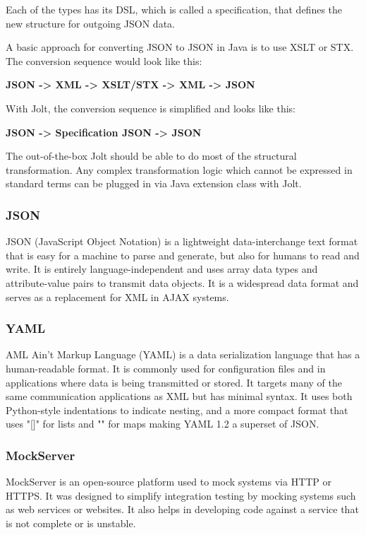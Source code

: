 Each of the types has its DSL, which is called a specification, that defines the new structure for outgoing JSON data.

A basic approach for converting JSON to JSON in Java is to use XSLT or STX. The conversion sequence would look like this:
\begin{center}
\textbf{JSON -> XML -> XSLT/STX -> XML -> JSON}
\end{center}

With Jolt, the conversion sequence is simplified and looks like this:
\begin{center}
\textbf{JSON -> Specification JSON -> JSON}
\end{center}

The out-of-the-box Jolt should be able to do most of the structural transformation. Any complex transformation logic which cannot be expressed in standard terms can be plugged in via Java extension class with Jolt.~\cite{jolt}

\subsubsection{JSON}
JSON (JavaScript Object Notation) is a lightweight data-interchange text format that is easy for a machine to parse and generate, but also for humans to read and write. It is entirely language-independent and uses array data types and attribute-value pairs to transmit data objects. It is a widespread data format and serves as a replacement for XML in AJAX systems.~\cite{json}

\subsubsection{YAML}
AML Ain't Markup Language (YAML) is a data serialization language that has a human-readable format. It is commonly used for configuration files and in applications where data is being transmitted or stored. It targets many of the same communication applications as XML but has minimal syntax. It uses both Python-style indentations to indicate nesting, and a more compact format that uses "[]" for lists and "{}" for maps making YAML 1.2 a superset of JSON.~\cite{yaml}

\subsubsection{MockServer}
MockServer is an open-source platform used to mock systems via HTTP or HTTPS. It was designed to simplify integration testing by mocking systems such as web services or websites. It also helps in developing code against a service that is not complete or is unstable.~\cite{mockserver}

